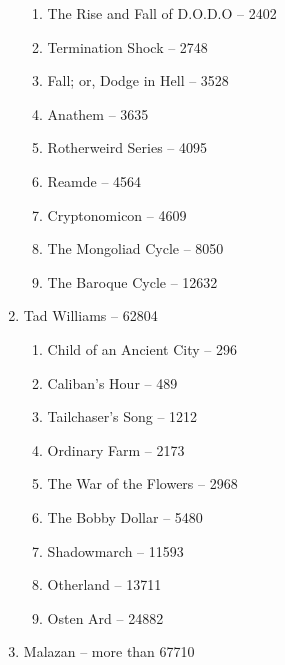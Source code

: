 \documentclass[a4paper, 11pt]{proc} %
\begin{document}
\begin{enumerate}
\begin{enumerate}
            \item The Rise and Fall of D.O.D.O -- 2402
            \item Termination Shock -- 2748
            \item Fall; or, Dodge in Hell -- 3528
            \item Anathem -- 3635
            \item Rotherweird Series -- 4095
            \item Reamde -- 4564
            \item Cryptonomicon -- 4609
            \item The Mongoliad Cycle -- 8050
            \item The Baroque Cycle -- 12632
        \end{enumerate}
    \item Tad Williams -- 62804
        \begin{enumerate}
            \item Child of an Ancient City -- 296
            \item Caliban's Hour -- 489
            \item Tailchaser's Song -- 1212
            \item Ordinary Farm -- 2173
            \item The War of the Flowers -- 2968
            \item The Bobby Dollar -- 5480
            \item Shadowmarch -- 11593
            \item Otherland -- 13711
            \item Osten Ard -- 24882
        \end{enumerate}
    \item Malazan -- more than 67710


\end{enumerate}
\end{document}
